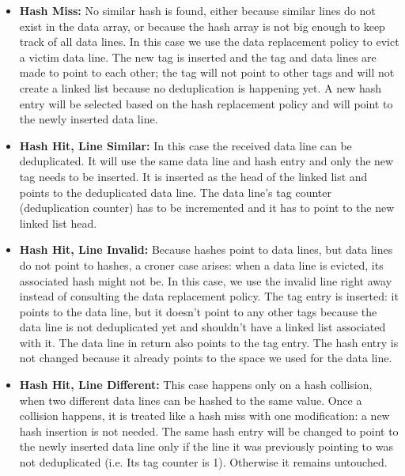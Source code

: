 \begin{itemize}
    \item \textbf{Hash Miss:} No similar hash is found, either because similar lines do not exist in the data array, or because the hash array is not big enough to keep track of all data lines. In this case we use the data replacement policy to evict a victim data line. The new tag is inserted and the tag and data lines are made to point to each other; the tag will not point to other tags and will not create a linked list because no deduplication is happening yet. A new hash entry will be selected based on the hash replacement policy and will point to the newly inserted data line.
    \item \textbf{Hash Hit, Line Similar:} In this case the received data line can be deduplicated. It will use the same data line and hash entry and only the new tag needs to be inserted. It is inserted as the head of the linked list and points to the deduplicated data line. The data line's tag counter (deduplication counter) has to be incremented and it has to point to the new linked list head.
    \item \textbf{Hash Hit, Line Invalid:} Because hashes point to data lines, but data lines do not point to hashes, a croner case arises: when a data line is evicted, its associated hash might not be. In this case, we use the invalid line right away instead of consulting the data replacement policy. The tag entry is inserted: it points to the data line, but it doesn't point to any other tags because the data line is not deduplicated yet and shouldn't have a linked list associated with it. The data line in return also points to the tag entry. The hash entry is not changed because it already points to the space we used for the data line.
    \item \textbf{Hash Hit, Line Different:} This case happens only on a hash collision, when two different data lines can be hashed to the same value. Once a collision happens, it is treated like a hash miss with one modification: a new hash insertion is not needed. The same hash entry will be changed to point to the newly inserted data line only if the line it was previously pointing to was not deduplicated (i.e. Its tag counter is 1). Otherwise it remains untouched.
\end{itemize}

